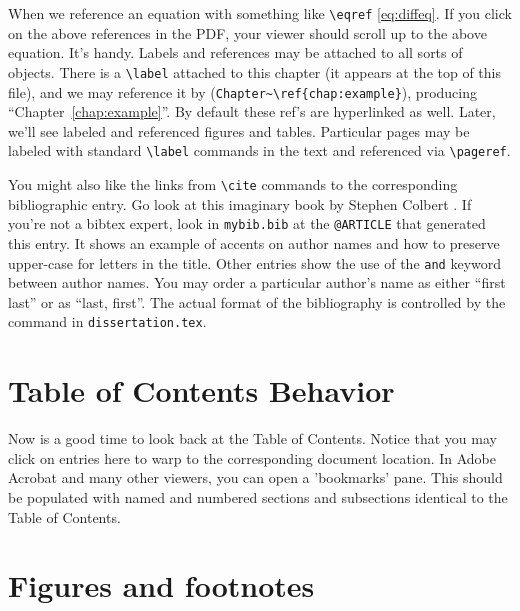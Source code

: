 When we reference an equation with something like 
{\verb!\eqref!} 
\eqref{eq:diffeq}. If you
click on the above references in the PDF, your viewer should scroll up to
the above equation. It's handy. 
Labels and references may be attached to all
sorts of objects.  There is a {\verb!\label!} attached to this chapter (it
appears at the top of this file), and we may reference it by
({\verb!Chapter~\ref{chap:example}!}), producing
``Chapter~\ref{chap:example}''.  By default these ref's are hyperlinked as
well.  Later, we'll see labeled and referenced figures and tables.
Particular pages may be labeled with standard {\verb!\label!} commands in
the text and referenced via {\verb!\pageref!}.

You might also like the links from 
{\verb!\cite!} commands to the corresponding bibliographic entry.
Go look at this imaginary book by Stephen Colbert \cite{fancy}.  If you're
not a bibtex expert, look in \texttt{mybib.bib} at the {\verb!@ARTICLE!}
that generated this entry.  It shows an example of accents on author names
and how to preserve upper-case for letters in the title.  Other entries show
the use of the {\verb"and"} keyword between author names.  You may order a
particular author's name as either ``first last'' or as ``last, first''.
The actual format of the bibliography is controlled by the 
{\verb""} command in \texttt{dissertation.tex}.


\section{Table of Contents Behavior}
Now is a good time to look back at the Table of Contents.  Notice that you
may click on entries here to warp to the corresponding document location.
In Adobe Acrobat and many other viewers, you can open a 'bookmarks' pane.
This should be populated with named and numbered sections and subsections
identical to the Table of Contents. 

\section{Figures and footnotes}

